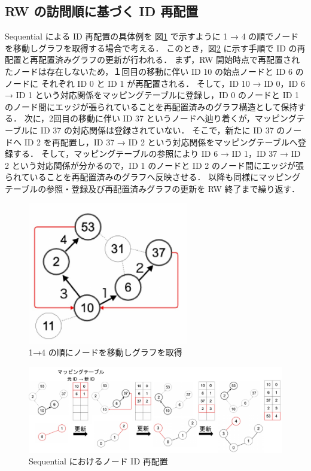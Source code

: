 \subsection{RW の訪問順に基づく ID 再配置}
Sequential による ID 再配置の具体例を 図\ref{sequential-rw} で示すように 1 → 4 の順でノードを移動しグラフを取得する場合で考える．
このとき，図\ref{sequential} に示す手順で ID の再配置と再配置済みグラフの更新が行われる．
まず，RW 開始時点で再配置されたノードは存在しないため，１回目の移動に伴い ID 10 の始点ノードと ID 6 のノードに
それぞれ ID 0 と ID 1 が再配置される．
そして，ID 10 → ID 0，ID 6 → ID 1 という対応関係をマッピングテーブルに登録し，ID 0 のノードと ID 1 のノード間にエッジが張られていることを再配置済みのグラフ構造として保持する．
次に，2回目の移動に伴い ID 37 というノードへ辿り着くが，マッピングテーブルに ID 37 の対応関係は登録されていない．
そこで，新たに ID 37 のノードへ ID 2 を再配置し，ID 37 → ID 2 という対応関係をマッピングテーブルへ登録する．
そして，マッピングテーブルの参照により ID 6 → ID 1，ID 37 → ID 2 という対応関係が分かるので，ID 1 のノードと ID 2 のノード間にエッジが張られていることを再配置済みのグラフへ反映させる．
以降も同様にマッピングテーブルの参照・登録及び再配置済みグラフの更新を RW 終了まで繰り返す．
\begin{figure}[t]
  \centering
  \includegraphics[width=7cm]{./figure/sequential-rw.pdf}
  \caption{1→4 の順にノードを移動しグラフを取得}
  \label{sequential-rw}
\end{figure}
\begin{figure}[t]
  \centering
  \includegraphics[width=\linewidth]{./figure/sequential.pdf}
  \caption{Sequential におけるノード ID 再配置}
  \label{sequential}
\end{figure}

